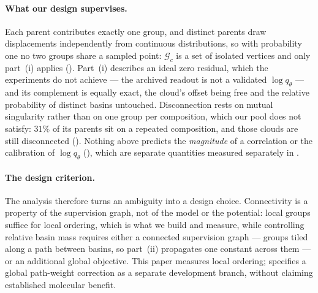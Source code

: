 \paragraph{What our design supervises.} Each parent contributes exactly one group, and distinct
parents draw displacements independently from continuous distributions, so with probability one no
two groups share a sampled point: $\mathcal{G}_c$ is a set of isolated vertices and only part~(i)
applies (). Part~(i) describes an ideal zero residual, which the experiments do not achieve --- the archived readout is not a validated $\log q_\theta$ --- and its complement is equally exact, the cloud's offset being free and the
relative probability of distinct basins untouched. Disconnection rests on mutual singularity rather
than on one group per composition, which our pool does not satisfy: $31\%$ of its parents sit on a
repeated composition, and those clouds are still disconnected (). Nothing
above predicts the \emph{magnitude} of a correlation or the calibration of $\log q_\theta$
(), which are separate quantities measured separately in .

\paragraph{The design criterion.} The analysis therefore turns an ambiguity into a design choice.
Connectivity is a property of the supervision graph, not of the model or the potential: local groups
suffice for local ordering, which is what we build and measure, while controlling relative basin
mass requires either a connected supervision graph --- groups tiled along a path between basins, so
part~(ii) propagates one constant across them --- or an additional global objective. This paper
measures local ordering;  specifies a global path-weight correction
as a separate development branch, without claiming established molecular benefit.
